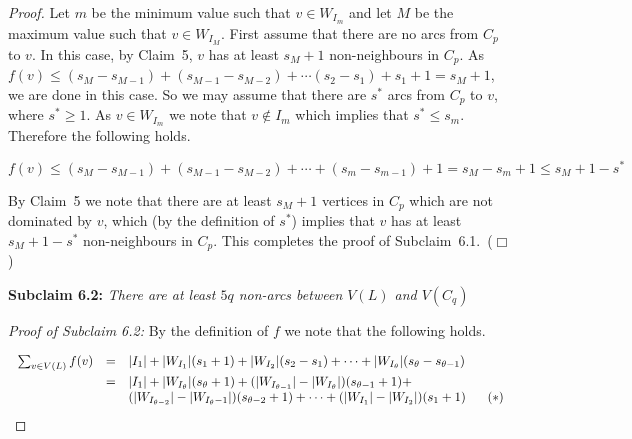 \documentclass{article}
\newcommand{\smallqed}{\hfill {\tiny ($\Box$)}}
\newcommand{\eqSp}{\vspace{0.1cm}}
\newcommand{\2}{\vspace{2mm}}
\theoremstyle{plain}
\theoremstyle{definition}
\begin{document}
\begin{proof}
Let $m$ be the minimum value such that $v \in W_{I_m}$ and let $M$ be the maximum value
such that $v \in W_{I_M}$. 
First assume that there are no arcs from $C_p$ to $v$. In this case, by Claim~5, $v$ has
at least $s_M + 1$ non-neighbours in $C_p$. As $f(v) \leq (s_M - s_{M-1})+(s_{M-1}-s_{M-2}) + \cdots
(s_2-s_1) + s_1+1 = s_M+1$, we are done in this case.  So we may assume that there are $s^*$ arcs from
$C_p$ to $v$, where $s^* \geq 1$. As $v \in W_{I_m}$ we note that $v \not\in I_m$ which implies that
$s^* \leq s_m$. Therefore the following holds.

\[
f(v) \leq (s_M - s_{M-1})+(s_{M-1}-s_{M-2}) + \cdots + (s_m - s_{m-1}) + 1 = s_M - s_m + 1 \leq s_M + 1 - s^* 
\]

By Claim~5 we note that there are at least $s_M + 1$ vertices in $C_p$ which are not dominated by $v$, which 
(by the definition of $s^*$) implies that $v$ has at least $s_M + 1 - s^*$ non-neighbours in $C_p$. This
completes the proof of Subclaim~6.1.~\smallqed{}


\2

{\bf Subclaim 6.2:} {\em There are at least $5q$ non-arcs between $V(L)$ and $V(C_q)$}

\2

{\em Proof of Subclaim 6.2:} By the definition of $f$ we note that the following holds.


\[
\begin{array}{rcl} \eqSp{}
\sum_{v \in V(L)} f(v) & = & |I_1| + |W_{I_1}|(s_1+1) + |W_{I_2}|(s_2-s_1) + \cdots + |W_{I_{\theta}}|(s_{\theta}-s_{\theta -1})  \\ 
% 
& = & |I_1| + |W_{I_\theta}|(s_{\theta}+1) + (|W_{I_{\theta -1}}|-|W_{I_\theta}|)(s_{\theta-1}+1) + \\
& & \hspace{0.0cm}  (|W_{I_{\theta - 2}}|-|W_{I_\theta - 1}| )(s_{\theta-2}+1)  
+  \cdots + (|W_{I_1}| -|W_{I_2}|)(s_1+1)  \hspace{0.6cm} (*)  \\
 \end{array}
\]




\end{proof}
\end{document}
